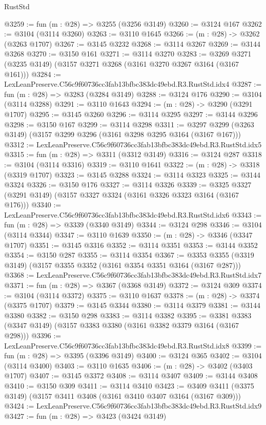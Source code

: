\begin{lexlean}{RustStd}
\begin{coremodule}
@3259 := fun (m : @28) => @3255 (@3256 @3149)
@3260 := @3124 @167
@3262 := @3104 (@3114 @3260)
@3263 := @3110 @1645
@3266 := (m : @28) -> @3262 (@3263 @1707)
@3267 := @3145 @3232
@3268 := @3114 @3267
@3269 := @3144 @3268
@3270 := @3150 @161
@3271 := @3114 @3270
@3283 := @3269 @3271 (@3235 @3149) (@3157 @3271 @3268 (@3161 @3270 @3267 @3164 (@3167 @161)))
@3284 := LexLeanPreserve.C56c9f60736cc3fab13bfbc383dc49ebd.R3.RustStd.idx4
@3287 := fun (m : @28) => @3283 (@3284 @3149)
@3288 := @3124 @176
@3290 := @3104 (@3114 @3288)
@3291 := @3110 @1643
@3294 := (m : @28) -> @3290 (@3291 @1707)
@3295 := @3145 @3260
@3296 := @3114 @3295
@3297 := @3144 @3296
@3298 := @3150 @167
@3299 := @3114 @3298
@3311 := @3297 @3299 (@3263 @3149) (@3157 @3299 @3296 (@3161 @3298 @3295 @3164 (@3167 @167)))
@3312 := LexLeanPreserve.C56c9f60736cc3fab13bfbc383dc49ebd.R3.RustStd.idx5
@3315 := fun (m : @28) => @3311 (@3312 @3149)
@3316 := @3124 @287
@3318 := @3104 (@3114 @3316)
@3319 := @3110 @1641
@3322 := (m : @28) -> @3318 (@3319 @1707)
@3323 := @3145 @3288
@3324 := @3114 @3323
@3325 := @3144 @3324
@3326 := @3150 @176
@3327 := @3114 @3326
@3339 := @3325 @3327 (@3291 @3149) (@3157 @3327 @3324 (@3161 @3326 @3323 @3164 (@3167 @176)))
@3340 := LexLeanPreserve.C56c9f60736cc3fab13bfbc383dc49ebd.R3.RustStd.idx6
@3343 := fun (m : @28) => @3339 (@3340 @3149)
@3344 := @3124 @298
@3346 := @3104 (@3114 @3344)
@3347 := @3110 @1639
@3350 := (m : @28) -> @3346 (@3347 @1707)
@3351 := @3145 @3316
@3352 := @3114 @3351
@3353 := @3144 @3352
@3354 := @3150 @287
@3355 := @3114 @3354
@3367 := @3353 @3355 (@3319 @3149) (@3157 @3355 @3352 (@3161 @3354 @3351 @3164 (@3167 @287)))
@3368 := LexLeanPreserve.C56c9f60736cc3fab13bfbc383dc49ebd.R3.RustStd.idx7
@3371 := fun (m : @28) => @3367 (@3368 @3149)
@3372 := @3124 @309
@3374 := @3104 (@3114 @3372)
@3375 := @3110 @1637
@3378 := (m : @28) -> @3374 (@3375 @1707)
@3379 := @3145 @3344
@3380 := @3114 @3379
@3381 := @3144 @3380
@3382 := @3150 @298
@3383 := @3114 @3382
@3395 := @3381 @3383 (@3347 @3149) (@3157 @3383 @3380 (@3161 @3382 @3379 @3164 (@3167 @298)))
@3396 := LexLeanPreserve.C56c9f60736cc3fab13bfbc383dc49ebd.R3.RustStd.idx8
@3399 := fun (m : @28) => @3395 (@3396 @3149)
@3400 := @3124 @365
@3402 := @3104 (@3114 @3400)
@3403 := @3110 @1635
@3406 := (m : @28) -> @3402 (@3403 @1707)
@3407 := @3145 @3372
@3408 := @3114 @3407
@3409 := @3144 @3408
@3410 := @3150 @309
@3411 := @3114 @3410
@3423 := @3409 @3411 (@3375 @3149) (@3157 @3411 @3408 (@3161 @3410 @3407 @3164 (@3167 @309)))
@3424 := LexLeanPreserve.C56c9f60736cc3fab13bfbc383dc49ebd.R3.RustStd.idx9
@3427 := fun (m : @28) => @3423 (@3424 @3149)

\end{coremodule}
\end{lexlean}
